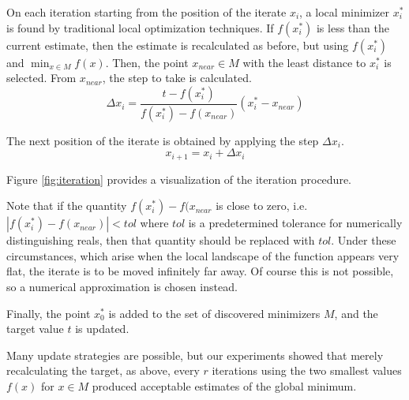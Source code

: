 \documentclass[12pt]{article}
\begin{document}
On each iteration starting from the position of the iterate $x_i$, a local
minimizer $x_i^*$ is found by traditional local optimization techniques.
If $f(x_i^*)$ is less than the current estimate, then the estimate is
recalculated as before, but using $f(x_i^*)$ and $\min_{x \in M} f(x)$.
Then, the point $x_{near} \in M$ with the least distance to $x_i^*$ is
selected.
From $x_{near}$, the step to take is calculated.
\begin{equation}
    \Delta x_i =
        \frac{t - f(x_i^*)}{f(x_i^*) - f(x_{near})} (x_i^* - x_{near})
    \label{eqn:dx}
\end{equation}

The next position of the iterate is obtained by applying the step
$\Delta x_i$.
$$
    x_{i+1} = x_i + \Delta x_i
$$

Figure \ref{fig:iteration} provides a visualization of the iteration
procedure.

Note that if the quantity $f(x_i^*) - f(x_{near}$ is close to zero, i.e.
$|f(x_i^*) - f(x_{near})| < tol$ where $tol$ is a predetermined tolerance
for numerically distinguishing reals, then that quantity should be
replaced with $tol$.
Under these circumstances, which arise when the local landscape of the
function appears very flat, the iterate is to be moved infinitely far away.
Of course this is not possible, so a numerical approximation is chosen
instead.

Finally, the point $x_0^*$ is added to the set of discovered minimizers
$M$, and the target value $t$ is updated.

Many update strategies are possible, but our experiments showed that merely
recalculating the target, as above, every $r$ iterations using the two
smallest values $f(x)$ for $x \in M$ produced acceptable estimates of the
global minimum.
\end{document}
